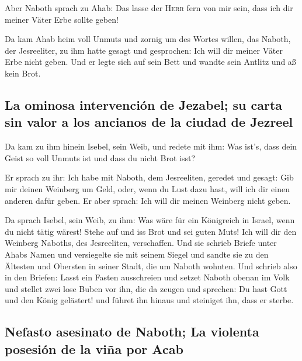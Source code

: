  Aber Naboth sprach zu Ahab: Das lasse der \textsc{Herr}
fern von mir sein, dass ich dir meiner Väter Erbe sollte geben!

 Da kam Ahab heim voll Unmuts und zornig um des Wortes
willen, das Naboth, der Jesreeliter, zu ihm hatte gesagt und gesprochen:
Ich will dir meiner Väter Erbe nicht geben. Und er legte sich auf sein
Bett und wandte sein Antlitz und aß kein Brot.

\hypertarget{la-ominosa-intervenciuxf3n-de-jezabel-su-carta-sin-valor-a-los-ancianos-de-la-ciudad-de-jezreel}{%
\subsection{La ominosa intervención de Jezabel; su carta sin valor a los
ancianos de la ciudad de
Jezreel}\label{la-ominosa-intervenciuxf3n-de-jezabel-su-carta-sin-valor-a-los-ancianos-de-la-ciudad-de-jezreel}}

 Da kam zu ihm hinein Isebel, sein Weib, und redete mit
ihm: Was ist's, dass dein Geist so voll Unmuts ist und dass du nicht
Brot isst?

 Er sprach zu ihr: Ich habe mit Naboth, dem Jesreeliten,
geredet und gesagt: Gib mir deinen Weinberg um Geld, oder, wenn du Lust
dazu hast, will ich dir einen anderen dafür geben. Er aber sprach: Ich
will dir meinen Weinberg nicht geben.

 Da sprach Isebel, sein Weib, zu ihm: Was wäre für ein
Königreich in Israel, wenn du nicht tätig wärest! Stehe auf und iss Brot
und sei guten Muts! Ich will dir den Weinberg Naboths, des Jesreeliten,
verschaffen.  Und sie schrieb Briefe unter Ahabs Namen und
versiegelte sie mit seinem Siegel und sandte sie zu den Ältesten und
Obersten in seiner Stadt, die um Naboth wohnten.  Und
schrieb also in den Briefen: Lasst ein Fasten ausschreien und setzet
Naboth obenan im Volk  und stellet zwei lose Buben vor
ihn, die da zeugen und sprechen: Du hast Gott und den König gelästert!
und führet ihn hinaus und steiniget ihn, dass er sterbe.

\hypertarget{nefasto-asesinato-de-naboth-la-violenta-posesiuxf3n-de-la-viuxf1a-por-acab}{%
\subsection{Nefasto asesinato de Naboth; La violenta posesión de la viña
por
Acab}\label{nefasto-asesinato-de-naboth-la-violenta-posesiuxf3n-de-la-viuxf1a-por-acab}}

